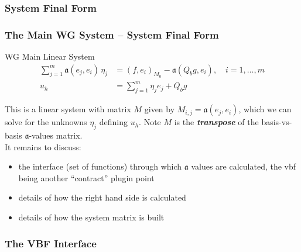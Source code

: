 \documentclass[compress]{beamer}
\begin{document}
\subsubsection{System Final Form}

\begin{frame}
  \frametitle{The Main WG System -- System Final Form}
  \begin{block}{WG Main Linear System}
    \begin{align*}
      \sum_{j=1}^m{\mathfrak{a}(e_j, e_i) \,\eta_j} &= (f, e_i)_{M_0} - \mathfrak{a}(Q_b g, e_i), \quad i=1,\dots,m\\
      u_h &= \sum_{j=1}^m{\eta_j e_j} + Q_b g
    \end{align*}

  \end{block}  
  \pause
  This is a linear system with matrix $M$ given by $M_{i,j} = \mathfrak{a}(e_j, e_i)$, which we can solve for the unknowns
  $\eta_j$ defining $u_h$.  Note $M$ is the \emph{\textbf{transpose}} of the basis-vs-basis $\mathfrak{a}$-values matrix.\\
  \pause
  It remains to discuss:
  \begin{itemize}[<+->]
    \item the interface (set of functions) through which $\mathfrak{a}$ values are calculated,
      the vbf being another ``contract'' plugin point
    \item details of how the right hand side is calculated
    \item details of how the system matrix is built
  \end{itemize}

\end{frame}


\subsubsection{The VBF Interface}
\end{document}
